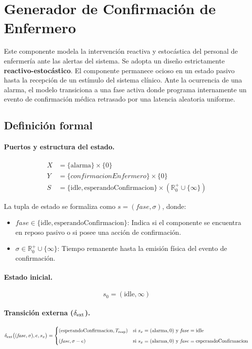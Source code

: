 \section{Generador de Confirmación de Enfermero}

Este componente modela la intervención reactiva y estocástica del personal de enfermería ante las alertas del sistema. Se adopta un diseño estrictamente \textbf{reactivo-estocástico}. El componente permanece ocioso en un estado pasivo hasta la recepción de un estímulo del sistema clínico. Ante la ocurrencia de una alarma, el modelo transiciona a una fase activa donde programa internamente un evento de confirmación médica retrasado por una latencia aleatoria uniforme.

\subsection{Definición formal}

\paragraph{Puertos y estructura del estado.}
\begin{align*}
X &= \{\text{alarma}\} \times \{0\} \\[4pt]
Y &= \{\mathit{confirmacionEnfermero}\} \times \{0\} \\[4pt]
S &= \{\text{idle}, \text{esperandoConfirmacion}\} \times (\mathbb{R}_0^+ \cup \{\infty\})
\end{align*}

La tupla de estado se formaliza como $s = (\mathit{fase}, \sigma)$, donde:
\begin{itemize}
    \item $\mathit{fase} \in \{\text{idle}, \text{esperandoConfirmacion}\}$: Indica si el componente se encuentra en reposo pasivo o si posee una acción de confirmación.
    \item $\sigma \in \mathbb{R}_0^+ \cup \{\infty\}$: Tiempo remanente hasta la emisión física del evento de confirmación.
\end{itemize}

\paragraph{Estado inicial.} 
\[
s_0 = (\text{idle}, \infty)
\]

\paragraph{Transición externa ($\delta_{\mathrm{ext}}$).}
\[
\delta_{\mathrm{ext}} \bigl( (\mathit{fase}, \sigma), e, s_x \bigr) =
\begin{cases}
(\text{esperandoConfirmacion}, T_{\mathrm{resp}}) & \text{si } s_x = (\text{alarma}, 0) \text{ y } \mathit{fase} = \text{idle} \\[6pt]
(\mathit{fase}, \sigma - e) & \text{si } s_x = (\text{alarma}, 0) \text{ y } \mathit{fase} = \text{esperandoConfirmacion}
\end{cases}
\]

